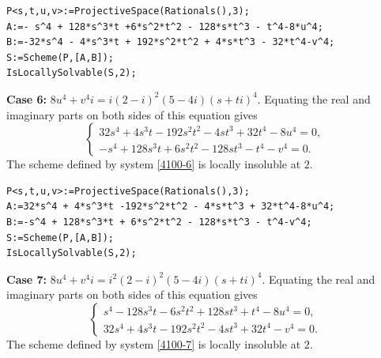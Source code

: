 \documentclass[a4paper,12pt,english,reqno]{amsart}
\begin{document}
\begin{lstlisting}
P<s,t,u,v>:=ProjectiveSpace(Rationals(),3);
A:=- s^4 + 128*s^3*t +6*s^2*t^2 - 128*s*t^3 - t^4-8*u^4;
B:=-32*s^4 - 4*s^3*t + 192*s^2*t^2 + 4*s*t^3 - 32*t^4-v^4;
S:=Scheme(P,[A,B]);
IsLocallySolvable(S,2);
\end{lstlisting}


{\bf Case 6:} $8u^4+v^4i=i(2-i)^2(5-4i)(s+ti)^4$. Equating the real and imaginary parts on both sides of this equation gives
\begin{equation}\label{4100-6}
\begin{cases}
32s^4 + 4s^3t -192s^2t^2 - 4st^3 + 32t^4-8u^4=0,\\
-s^4 + 128s^3t + 6s^2t^2 - 128st^3 - t^4-v^4=0.
\end{cases}
\end{equation}
The scheme defined by system \eqref{4100-6} is locally insoluble at $2$.





\begin{lstlisting}
P<s,t,u,v>:=ProjectiveSpace(Rationals(),3);
A:=32*s^4 + 4*s^3*t -192*s^2*t^2 - 4*s*t^3 + 32*t^4-8*u^4;
B:=-s^4 + 128*s^3*t + 6*s^2*t^2 - 128*s*t^3 - t^4-v^4;
S:=Scheme(P,[A,B]);
IsLocallySolvable(S,2);
\end{lstlisting}

{\bf Case 7:} $8u^4+v^4i=i^2(2-i)^2(5-4i)(s+ti)^4$. Equating the real and imaginary parts on both sides of this equation gives
\begin{equation}\label{4100-7}
\begin{cases}
s^4 - 128s^3t - 6s^2t^2 + 128st^3 + t^4 - 8u^4=0,\\
32s^4 +4s^3t - 192s^2t^2 -4st^3 + 32t^4 - v^4=0.
\end{cases}
\end{equation}
The scheme defined by system \eqref{4100-7} is locally insoluble at $2$.



\end{document}
